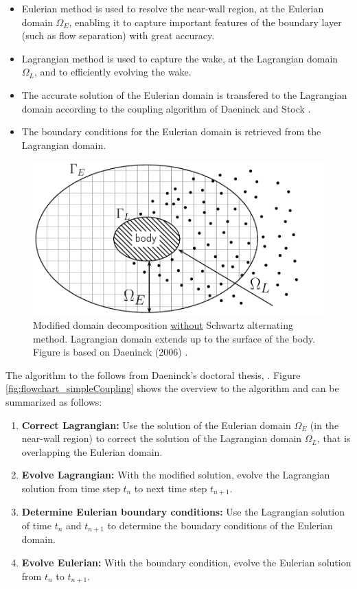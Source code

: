 	\begin{itemize}
	\item Eulerian method is used to resolve the near-wall region, at the Eulerian domain $\Omega_E$, enabling it to capture important features of the boundary layer (such as flow separation) with great accuracy.
	
	\item Lagrangian method is used to capture the wake, at the Lagrangian domain $\Omega_L$, and to efficiently evolving the wake.
	
	\item The accurate solution of the Eulerian domain is transfered to the Lagrangian domain according to the coupling algorithm of Daeninck \cite{Daeninck2006} and Stock \cite{Stock2010a}.
	
	\item The boundary conditions for the Eulerian domain is retrieved from the Lagrangian domain.
	\end{itemize}

	\begin{figure}[!t]
		\centering
		\includegraphics[width=0.6\linewidth]{figures/introduction/domainDecomposition_daenick_type2.pdf}
		\caption{Modified domain decomposition \underline{without} Schwartz alternating method. Lagrangian domain extends up to the surface of the body. Figure is based on Daeninck (2006) \cite{Daeninck2006}.}
		\label{fig:domainDecomposition_daenick}
	\end{figure}

The algorithm to the  follows from Daeninck's doctoral thesis, \cite{Daeninck2006}. Figure \ref{fig:flowchart_simpleCoupling} shows the overview to the algorithm and can be summarized as follows:

	\begin{enumerate}
	\item \textbf{Correct Lagrangian:} Use the solution of the Eulerian domain $\Omega_E$ (in the near-wall region) to correct the solution of the Lagrangian domain $\Omega_L$, that is overlapping the Eulerian domain.  
	
	\item \textbf{Evolve Lagrangian:} With the modified solution, evolve the Lagrangian solution from time step $t_n$ to next time step $t_{n+1}$.
	
	\item \textbf{Determine Eulerian boundary conditions:} Use the Lagrangian solution of time $t_n$ and $t_{n+1}$ to determine the boundary conditions of the Eulerian domain.
	
	\item \textbf{Evolve Eulerian:} With the boundary condition, evolve the Eulerian solution from $t_n$ to $t_{n+1}$.
	\end{enumerate}
	
